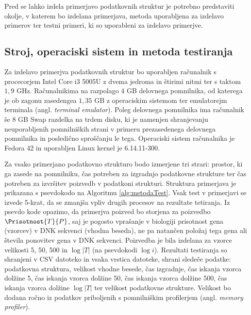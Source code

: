 Pred se lahko izdela primerjavo podatkovnih struktur je potrebno predstaviti okolje, v katerem bo izdelana primerjava, metoda uporabljena za izdelavo primerov ter testni primeri, ki so uporableni za izdelavo primerjve.

\subsection{Stroj, operaciski sistem in metoda testiranja}
Za izdelavo primerjva podatkovnih struktur bo uporabljen računalnik s procecorjem Intel Core i3 5005U z dvema jedroma in štirimi nitmi ter s taktom $1,9$ GHz. Računalnikima na razpolago 4 GB delovnega pomnilnika, od katerega je ob zagonu zasedengea $1,35$ GB z operaciskim sistemom ter emulatorejm terminala (angl. \textit{terminal emulator}). Poleg delovnega pomnilnika ima računalnik še $8$ GB Swap razdelka na trdem disku, ki je namenjen shranjevanju neuporabljenih pomnilniških strani v primeru prezasedenega delovnega pomnilnika in posledično sproščanju le tega. Operaciski sistem računalnika je Fedora 42 in uporabljen Linux kernel je 6.14.11-300.

Za vsako primerjano podatkovno strukturo bodo izmerjene tri strari: prostor, ki ga zasede na pomnilniku, čas potreben za izgradnjo podatkovne strukture ter čas potreben za izvršitev poizvedb v podatkoni strukturi. Struktura primerjava je prikazana s psevdokodo na Algoritmu \ref{alg:metodaTest}. Vsak test v primerjavi se izvede 5-krat, da se zmanjša vpliv drugih procesov na rezultate tetiranja. Iz psevdo kode opazimo, da primerjva poizved bo storjena za poizvedbo $\Prisotnost{T}{P}$, saj je pogosto vprašanje v biologiji prisotnost gena (vzorcev) v DNK sekvenci (vhodna beseda), ne pa natančen položaj tega gena ali števila ponovitev gena v DNK sekvenci. Poizvedba je bila izdelana za vzorce velikosti 5, 50, 500 in $\log{|T|}$ (na psevdokodi $\log{i}$). Rezultati testiranja so shranjeni v CSV datoteko in vsaka vrstica datoteke, shrani sledeče podatke: podatkovna struktura, velikost vhodne besede, čas izgradnje, čas iskanja vzorca dolžine 5, čas iskanja vzorca dolžine 50, čas iskanja vzorca dolžine 500, čas iskanja vzorca dolžine $\log{|T|}$ ter velikost podatkovne strukture. Velikost bo dodana ročno iz podatkov priboljenih s pomnilniškim profilerjem (angl. \textit{memory profiler}). 


